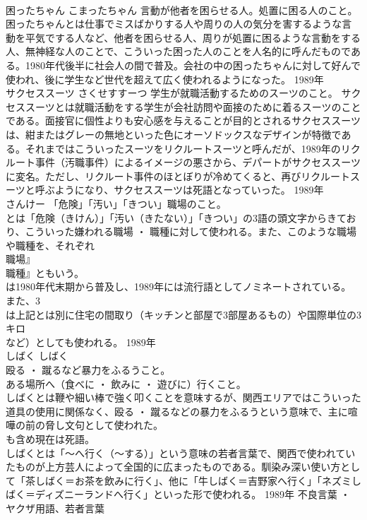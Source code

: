 \documentclass[8pt]{extreport}
\begin{document}
\begin{CJK}{UTF8}{min}
\\	困ったちゃん	こまったちゃん	言動が他者を困らせる人。処置に困る人のこと。	困ったちゃんとは仕事でミスばかりする人や周りの人の気分を害するような言動を平気でする人など、他者を困らせる人、周りが処置に困るような言動をする人、無神経な人のことで、こういった困った人のことを人名的に呼んだものである。1980年代後半に社会人の間で普及。会社の中の困ったちゃんに対して好んで使われ、後に学生など世代を超えて広く使われるようになった。	1989年	
\\	サクセススーツ	さくせすすーつ	学生が就職活動するためのスーツのこと。	サクセススーツとは就職活動をする学生が会社訪問や面接のために着るスーツのことである。面接官に個性よりも安心感を与えることが目的とされるサクセススーツは、紺またはグレーの無地といった色にオーソドックスなデザインが特徴である。それまではこういったスーツをリクルートスーツと呼んだが、1989年のリクルート事件（汚職事件）によるイメージの悪さから、デパートがサクセススーツに変名。ただし、リクルート事件のほとぼりが冷めてくると、再びリクルートスーツと呼ぶようになり、サクセススーツは死語となっていった。	1989年	
\\	さんけー	「危険」「汚い」「きつい」職場のこと。	
\\	とは「危険（きけん）」「汚い（きたない）」「きつい」の3語の頭文字からきており、こういった嫌われる職場 ・ 職種に対して使われる。また、このような職場や職種を、それぞれ
\\	職場』
\\	職種』ともいう。 
\\	は1980年代末期から普及し、1989年には流行語としてノミネートされている。 また、3
\\	は上記とは別に住宅の間取り（キッチンと部屋で3部屋あるもの）や国際単位の3キロ
\\	など）としても使われる。	1989年	
\\	しばく	しばく	
\\	殴る ・ 蹴るなど暴力をふるうこと。 
\\	ある場所へ（食べに ・ 飲みに ・ 遊びに）行くこと。	
\\	しばくとは鞭や細い棒で強く叩くことを意味するが、関西エリアではこういった道具の使用に関係なく、殴る ・ 蹴るなどの暴力をふるうという意味で、主に喧嘩の前の脅し文句として使われた。
\\	も含め現在は死語。 
\\	しばくとは「～へ行く（～する）」という意味の若者言葉で、関西で使われていたものが上方芸人によって全国的に広まったものである。馴染み深い使い方として「茶しばく＝お茶を飲みに行く」、他に「牛しばく＝吉野家へ行く」「ネズミしばく＝ディズニーランドへ行く」といった形で使われる。	1989年	不良言葉 ・ ヤクザ用語、若者言葉	

\end{CJK}
\end{document}
